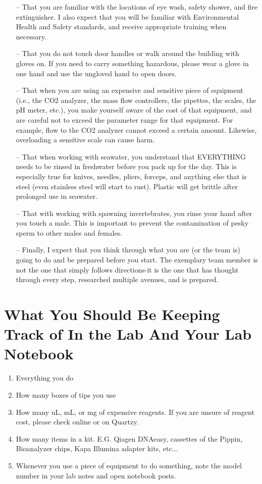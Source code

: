 \documentclass[11pt, oneside]{article}
\begin{document}
\begin{itemize}
			\item[--] That you are familiar with the locations of eye wash, safety shower, and fire extinguisher.  I also expect that you will be familiar with 			Environmental Health and Safety standards, and receive appropriate training when necessary.
			\item[--] That you do not touch door handles or walk around the building with gloves on.  If you need to carry something hazardous, please 			wear a glove in one hand and use the ungloved hand to open doors.
			\item[--] That when you are using an expensive and sensitive piece of equipment (i.e., the CO2 analyzer, the mass flow controllers, the 				pipettes, the scales, the pH meter, etc.), you make yourself aware of the cost of that equipment, and are careful not to exceed the 					parameter range for that equipment.  For example, flow to the CO2 analyzer cannot exceed a certain amount.  Likewise, overloading a 				sensitive scale can cause harm.
			\item[--] That when working with seawater, you understand that EVERYTHING needs to be rinsed in freshwater before you pack up for the 			day. This is especially true for knives, needles, pliers, forceps, and anything else that is steel (even stainless steel will start to rust).  Plastic 			will get brittle after prolonged use in seawater.
			\item[--] That with working with spawning invertebrates, you rinse your hand after you touch a male.  This is important to prevent the 					contamination of pesky sperm to other males and females.
			 \item[--] Finally, I expect that you think through what you are (or the team is) going to do and be prepared before you start.  The exemplary 			team member is not the one that simply follows directions-it is the one that has thought through every step, researched multiple avenues, 			and is prepared.   

		\end{itemize}

	\newpage

\section{What You Should Be Keeping Track of In the Lab And Your Lab Notebook}
	\begin{enumerate}
		\item Everything you do
		\item How many boxes of tips you use
		\item How many uL, mL, or mg of expensive reagents.  If you are unsure of reagent cost, please check online or on Quartzy.
		\item How many items in a kit.  E.G. Qiagen DNAeasy, cassettes of the Pippin, Bioanalyzer chips, Kapa Illumina adapter kits, etc...
		\item Whenever you use a piece of equipment to do something, note the model number in your lab notes and open notebook posts.		
	\end{enumerate}
		
\end{document}
